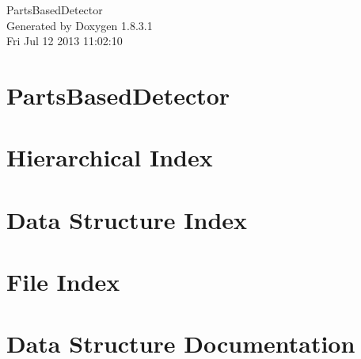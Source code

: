 \documentclass{book}
\begin{document}
\hypersetup{pageanchor=false,citecolor=blue}
\begin{titlepage}
\vspace*{7cm}
\begin{center}
{\Large Parts\-Based\-Detector }\\
\vspace*{1cm}
{\large Generated by Doxygen 1.8.3.1}\\
\vspace*{0.5cm}
{\small Fri Jul 12 2013 11:02:10}\\
\end{center}
\end{titlepage}
\clearemptydoublepage
{}
\tableofcontents
\clearemptydoublepage
{}
\hypersetup{pageanchor=true,citecolor=blue}
\chapter{Parts\-Based\-Detector}
\label{index}\hypertarget{index}{}
\chapter{Hierarchical Index}

\chapter{Data Structure Index}

\chapter{File Index}

\chapter{Data Structure Documentation}


























\end{document}
